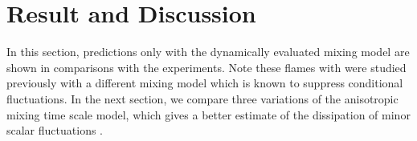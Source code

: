\section {Result and Discussion}
In this section, predictions only with the dynamically evaluated mixing model are shown in comparisons with the experiments. Note these flames with were studied previously \cite{Ge2011,Ge2013} with a different mixing model which is known to suppress conditional fluctuations. In the next section, we compare three variations of the anisotropic mixing time scale model, which gives a better estimate of the dissipation of minor scalar fluctuations \cite{Vo2017a}.
